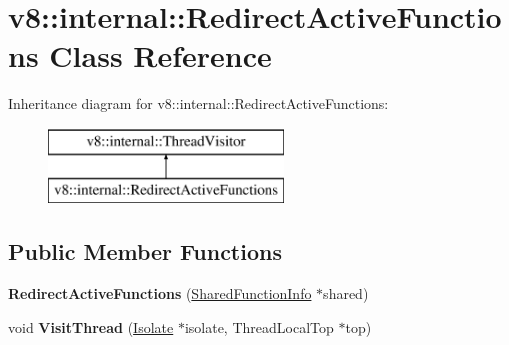 \hypertarget{classv8_1_1internal_1_1_redirect_active_functions}{}\section{v8\+:\+:internal\+:\+:Redirect\+Active\+Functions Class Reference}
\label{classv8_1_1internal_1_1_redirect_active_functions}
Inheritance diagram for v8\+:\+:internal\+:\+:Redirect\+Active\+Functions\+:\begin{figure}[H]
\begin{center}
\leavevmode
\includegraphics[height=2.000000cm]{classv8_1_1internal_1_1_redirect_active_functions}
\end{center}
\end{figure}
\subsection*{Public Member Functions}
\begin{DoxyCompactItemize}
\item 
{\bfseries Redirect\+Active\+Functions} (\hyperlink{classv8_1_1internal_1_1_shared_function_info}{Shared\+Function\+Info} $\ast$shared)\hypertarget{classv8_1_1internal_1_1_redirect_active_functions_a49bd4a9cd586bb21ad32225157cc9da2}{}\label{classv8_1_1internal_1_1_redirect_active_functions_a49bd4a9cd586bb21ad32225157cc9da2}

\item 
void {\bfseries Visit\+Thread} (\hyperlink{classv8_1_1internal_1_1_isolate}{Isolate} $\ast$isolate, Thread\+Local\+Top $\ast$top)\hypertarget{classv8_1_1internal_1_1_redirect_active_functions_a0767af6a96ad4bb4ffab9598414dc365}{}\label{classv8_1_1internal_1_1_redirect_active_functions_a0767af6a96ad4bb4ffab9598414dc365}

\end{DoxyCompactItemize}
